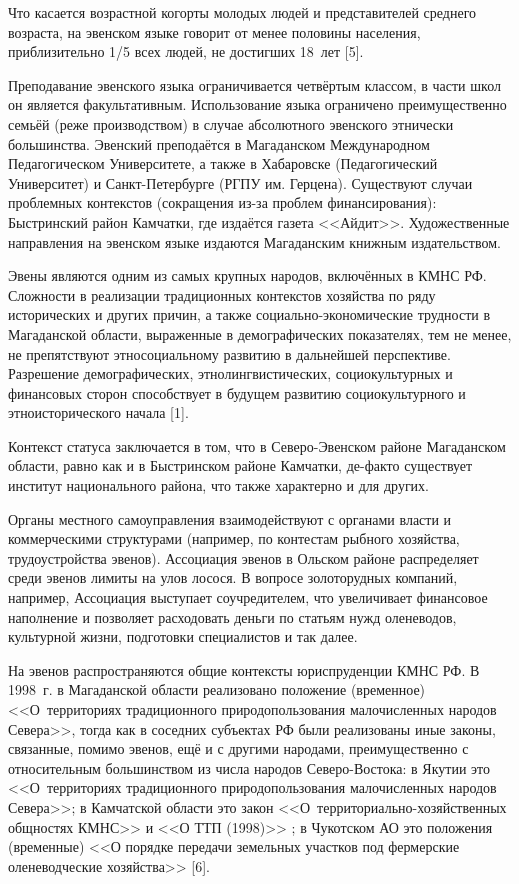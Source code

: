       Что касается возрастной когорты молодых людей и представителей среднего возраста, на эвенском языке говорит от менее половины населения, приблизительно 1/5 всех людей, не достигших 18~лет [5].

      Преподавание эвенского языка ограничивается четвёртым классом, в части школ он является факультативным. Использование языка ограничено преимущественно семьёй (реже производством) в случае абсолютного эвенского этнически большинства. Эвенский преподаётся в Магаданском Международном Педагогическом Университете, а также в Хабаровске (Педагогический Университет) и Санкт-Петербурге (РГПУ им. Герцена). Существуют случаи проблемных контекстов (сокращения из-за проблем финансирования): Быстринский район Камчатки, где издаётся газета <<Айдит>>. Художественные направления на эвенском языке издаются Магаданским книжным издательством.

      Эвены являются одним из самых крупных народов, включённых в КМНС РФ. Сложности в реализации традиционных контекстов хозяйства по ряду исторических и других причин, а также социально-экономические трудности в Магаданской области, выраженные в демографических показателях, тем не менее, не препятствуют этносоциальному развитию в дальнейшей перспективе. Разрешение демографических, этнолингвистических, социокультурных и финансовых сторон способствует в будущем развитию социокультурного и этноисторического начала [1].

     Контекст статуса заключается в том, что в Северо-Эвенском районе Магаданском области, равно как и в Быстринском районе Камчатки, де-факто существует институт национального района, что также характерно и для других.

      Органы местного самоуправления взаимодействуют с органами власти и коммерческими структурами (например, по контестам рыбного хозяйства, трудоустройства эвенов). Ассоциация эвенов в Ольском районе распределяет среди эвенов лимиты на улов лосося. В вопросе золоторудных компаний, например, Ассоциация выступает соучредителем, что увеличивает финансовое наполнение и позволяет расходовать деньги по статьям нужд оленеводов, культурной жизни, подготовки специалистов и так далее.

      На эвенов распространяются общие контексты юриспруденции КМНС РФ. В 1998~г. в Магаданской области реализовано положение (временное) <<О~территориях традиционного природопользования малочисленных народов Севера>>, тогда как в соседних субъектах РФ были реализованы иные законы, связанные, помимо эвенов, ещё и с другими народами, преимущественно с относительным большинством из числа народов Северо-Востока:  в Якутии это <<О~территориях традиционного природопользования малочисленных народов Севера>>; в Камчатской области это закон <<О~территориально-хозяйственных общностях КМНС>> и <<О ТТП (1998)>> ; в Чукотском АО это положения (временные) <<О порядке передачи земельных участков под фермерские оленеводческие хозяйства>> [6].

